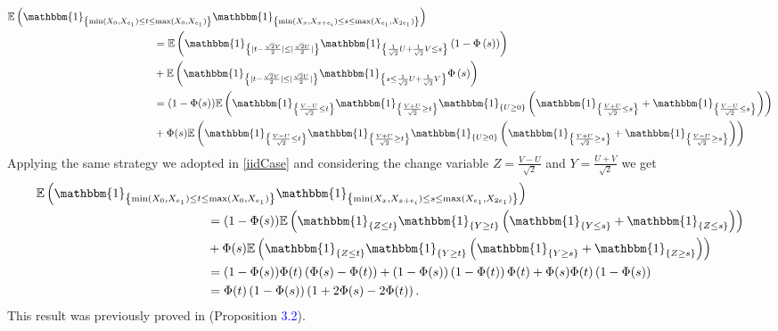 \documentclass[12pt]{article}
\theoremstyle{Theorem}
\begin{document}
{\small
\begin{align*}
\mathbb{E}\left(\mathbbm{1}_{\left\{\min(X_{\scriptscriptstyle 0}, X_{e_1}) \leq t \leq \max(X_{\scriptscriptstyle 0}, X_{e_1})\right\}}\mathbbm{1}_{\left\{\min(X_{\scriptscriptstyle x}, X_{x+e_i}) \leq s \leq \max(X_{e_1}, X_{2e_1}) \right\}}\right) & \\
& \hspace{-9cm} = \mathbb{E}\left(\mathbbm{1}_{\left\{ |t - \frac{\sqrt{2}V}{2}| \leq |\frac{\sqrt{2}U}{2}|\right\}}\mathbbm{1}_{\left\{\frac{1}{\sqrt{2}} U + \frac{1}{\sqrt{2}}V \leq s\right\}} \left(1 - \Phi\left(s\right)\right)\right) \\
& \hspace{-9cm} + \mathbb{E}\left(\mathbbm{1}_{\left\{ |t - \frac{\sqrt{2}V}{2}| \leq |\frac{\sqrt{2}U}{2}|\right\}}\mathbbm{1}_{\left\{ s \leq \frac{1}{\sqrt{2}}U + \frac{1}{\sqrt{2}}V \right\}}\Phi\left(s\right)\right) \\
& \hspace{-9cm} = (1-\Phi(s))\mathbb{E}\left(\mathbbm{1}_{\left\{\frac{V-U}{\sqrt{2}} \leq t \right\}}\mathbbm{1}_{\left\{\frac{V+U}{\sqrt{2}} \geq t \right\}}\mathbbm{1}_{\left\{U \geq 0\right\}}\left(\mathbbm{1}_{\left\{\frac{V+U}{\sqrt{2}} \leq s \right\}} + \mathbbm{1}_{\left\{\frac{V-U}{\sqrt{2}} \leq s \right\}}\right) \right)\\
& \hspace{-9cm} + \Phi(s)\mathbb{E}\left(\mathbbm{1}_{\left\{\frac{V-U}{\sqrt{2}} \leq t \right\}}\mathbbm{1}_{\left\{\frac{V+U}{\sqrt{2}} \geq t \right\}}\mathbbm{1}_{\left\{U \geq 0\right\}}\left(\mathbbm{1}_{\left\{\frac{V+U}{\sqrt{2}} \geq s \right\}} + \mathbbm{1}_{\left\{\frac{V-U}{\sqrt{2}} \geq s \right\}}\right) \right)
\end{align*}}
Applying the same strategy we adopted in \ref{iidCase} and considering the change variable $Z = \frac{V-U}{\sqrt{2}}$ and $Y = \frac{U+V}{\sqrt{2}}$ we get 
{\small
\begin{align*}
\mathbb{E}\left(\mathbbm{1}_{\left\{\min(X_{\scriptscriptstyle 0}, X_{e_1}) \leq t \leq \max(X_{\scriptscriptstyle 0}, X_{e_1})\right\}}\mathbbm{1}_{\left\{\min(X_{\scriptscriptstyle x}, X_{x+e_i}) \leq s \leq \max(X_{e_1}, X_{2e_1}) \right\}}\right) & \\
& \hspace{-9cm} = (1-\Phi(s))\mathbb{E}\left(\mathbbm{1}_{\left\{Z \leq t \right\}}\mathbbm{1}_{\left\{Y \geq t \right\}}\left(\mathbbm{1}_{\left\{Y \leq s \right\}} + \mathbbm{1}_{\left\{Z \leq s \right\}}\right) \right)\\
& \hspace{-9cm} + \Phi(s)\mathbb{E}\left(\mathbbm{1}_{\left\{Z \leq t \right\}}\mathbbm{1}_{\left\{Y \geq t \right\}}\left(\mathbbm{1}_{\left\{Y \geq s \right\}} + \mathbbm{1}_{\left\{Z \geq s \right\}}\right) \right) \\
& \hspace{-9cm}= (1-\Phi(s))\Phi(t)\left(\Phi(s) - \Phi(t)\right) + (1-\Phi(s))\left(1-\Phi(t)\right)\Phi(t)   + \Phi(s)\Phi(t)\left(1-\Phi(s)\right)\\
& \hspace{-9cm}= \Phi(t)\left(1-\Phi(s)\right)\left(1+ 2\Phi(s) - 2\Phi(t)\right).
\end{align*}}
This result was previously proved in \cite{Psymetrie} (Proposition \textcolor{blue}{3.2}).


\end{document}
